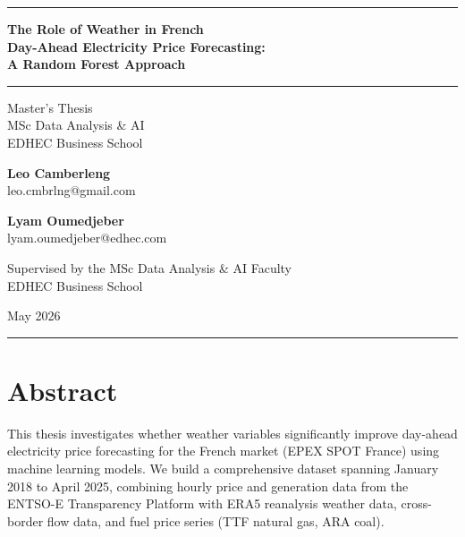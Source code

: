\documentclass[12pt, a4paper, oneside]{report}
\begin{document}
\begin{titlepage}
  \centering
  \vspace*{1cm}

  {\color{edhec}\rule{\linewidth}{2pt}}
  \vspace{0.5cm}

  {\LARGE\bfseries\color{edhec}
    The Role of Weather in French\\[6pt]
    Day-Ahead Electricity Price Forecasting:\\[6pt]
    A Random Forest Approach
  \par}

  \vspace{0.5cm}
  {\color{edhec}\rule{\linewidth}{1pt}}
  \vspace{1.5cm}

  {\large Master's Thesis\\[4pt]
   MSc Data Analysis \& AI\\[4pt]
   EDHEC Business School}

  \vspace{2cm}

  {\large\bfseries Leo Camberleng}\\[6pt]
  {\normalsize leo.cmbrlng@gmail.com}

  \vspace{1cm}

  {\large\bfseries Lyam Oumedjeber}\\[6pt]
  {\normalsize lyam.oumedjeber@edhec.com}

  \vspace{2cm}

  {\normalsize Supervised by the MSc Data Analysis \& AI Faculty\\[4pt]
   EDHEC Business School}

  \vspace{2cm}

  {\large May 2026}

  \vfill
  {\color{edhec}\rule{\linewidth}{2pt}}
\end{titlepage}

\chapter*{Abstract}

This thesis investigates whether weather variables significantly improve
day-ahead electricity price forecasting for the French market (EPEX SPOT
France) using machine learning models. We build a comprehensive dataset
spanning January 2018 to April 2025, combining hourly price and generation
data from the ENTSO-E Transparency Platform with ERA5 reanalysis weather data,
cross-border flow data, and fuel price series (TTF natural gas, ARA coal).
\end{document}
